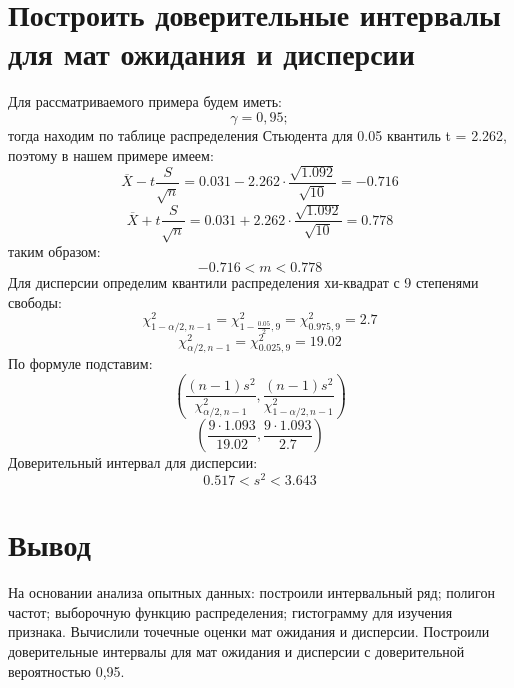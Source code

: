 \documentclass{article}
\begin{document}
\section{Построить доверительные интервалы для мат ожидания и дисперсии}
Для рассматриваемого примера будем иметь:
\[\gamma = 0,95;\]
тогда находим по таблице распределения Стьюдента для 0.05 квантиль  t = 2.262, поэтому в нашем примере имеем:
\[\overline{X}-t\frac{S}{\sqrt{n}} = 0.031 - 2.262 \cdot\frac{\sqrt{1.092}}{\sqrt{10}} = -0.716\]
\[\overline{X}+t\frac{S}{\sqrt{n}} = 0.031 + 2.262 \cdot\frac{\sqrt{1.092}}{\sqrt{10}} = 0.778\]
таким образом:
\[-0.716 < m < 0.778\]
Для дисперсии определим квантили распределения хи-квадрат с 9 степенями свободы:
\[
\chi^2_{1-\alpha/2, n-1} = \chi^2_{1-\frac{0.05}{2}, 9} = \chi^2_{0.975, 9} = 2.7
\]
\[
\chi^2_{\alpha/2, n-1} = \chi^2_{0.025, 9} = 19.02
\]
По формуле подставим:
\[
\left(\frac{{(n-1)s^2}}{{\chi^2_{\alpha/2, n-1}}}, \frac{{(n-1)s^2}}{{\chi^2_{1-\alpha/2, n-1}}} \right)
\]
\[
\left( \frac{{9\cdot 1.093}}{19.02 }, \frac{{9\cdot 1.093}}{2.7} \right)
\]
Доверительный интервал для дисперсии:
\[ 0.517 < s^2 < 3.643\]
\section*{Вывод}
На основании анализа опытных данных: построили интервальный ряд; полигон частот; выборочную функцию распределения; гистограмму для изучения признака.
Вычислили точечные оценки мат ожидания и дисперсии.
Построили доверительные интервалы для мат ожидания и дисперсии с доверительной вероятностью 0,95.
\end{document}
